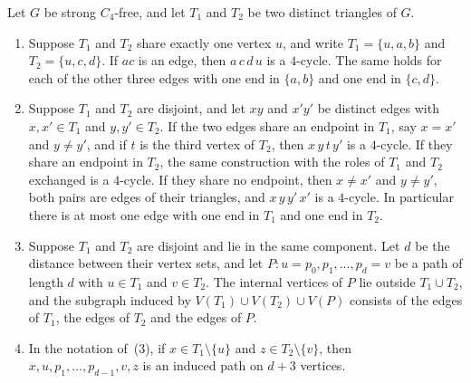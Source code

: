 \documentclass[ASNA]{USG}
\theoremstyle{WBstyletwo}
\numberwithin{equation}{section}
\begin{document}
\begin{lemma}\label{lem:connect}
Let $G$ be strong $C_4$-free, and let $T_1$ and $T_2$ be two distinct triangles of $G$.
\begin{enumerate}
\item Suppose $T_1$ and $T_2$ share exactly one vertex $u$, and write $T_1=\{u,a,b\}$ and $T_2=\{u,c,d\}$. If $ac$ is an edge, then $a\,c\,d\,u$ is a $4$-cycle. The same holds for each of the other three edges with one end in $\{a,b\}$ and one end in $\{c,d\}$.
\item Suppose $T_1$ and $T_2$ are disjoint, and let $xy$ and $x'y'$ be distinct edges with $x,x'\in T_1$ and $y,y'\in T_2$. If the two edges share an endpoint in $T_1$, say $x=x'$ and $y\neq y'$, and if $t$ is the third vertex of $T_2$, then $x\,y\,t\,y'$ is a $4$-cycle. If they share an endpoint in $T_2$, the same construction with the roles of $T_1$ and $T_2$ exchanged is a $4$-cycle. If they share no endpoint, then $x\neq x'$ and $y\neq y'$, both pairs are edges of their triangles, and $x\,y\,y'\,x'$ is a $4$-cycle. In particular there is at most one edge with one end in $T_1$ and one end in $T_2$.
\item Suppose $T_1$ and $T_2$ are disjoint and lie in the same component. Let $d$ be the distance between their vertex sets, and let $P:u=p_0,p_1,\ldots,p_d=v$ be a path of length $d$ with $u\in T_1$ and $v\in T_2$. The internal vertices of $P$ lie outside $T_1\cup T_2$, and the subgraph induced by $V(T_1)\cup V(T_2)\cup V(P)$ consists of the edges of $T_1$, the edges of $T_2$ and the edges of $P$.
\item In the notation of~(3), if $x\in T_1\setminus\{u\}$ and $z\in T_2\setminus\{v\}$, then $x,u,p_1,\ldots,p_{d-1},v,z$ is an induced path on $d+3$ vertices.
\end{enumerate}
\end{lemma}
\end{document}
